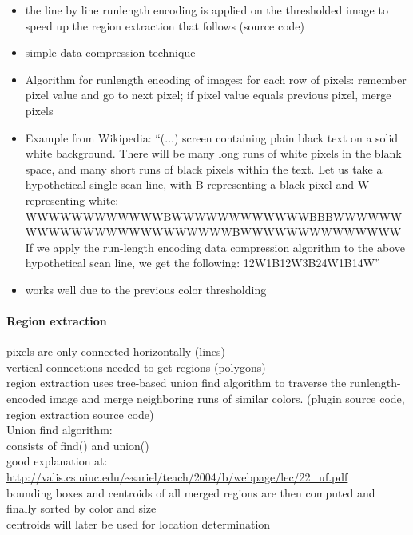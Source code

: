 \begin{itemize}
  \item the line by line runlength encoding is applied on the thresholded image to speed up the region extraction that follows (source code)
  \item simple data compression technique
  \item Algorithm for runlength encoding of images:
for each row of pixels:
remember pixel value and go to next pixel;
if pixel value equals previous pixel, merge pixels
  \item Example from Wikipedia:
“(...) screen containing plain black text on a solid white background. There will be many long runs of white pixels in the blank space, and many short runs of black pixels within the text. Let us take a hypothetical single scan line, with B representing a black pixel and W representing white:
WWWWWWWWWWWWBWWWWWWWWWWWWBBBWWWWWWWWWWWWWWWWWWWWWWWWBWWWWWWWWWWWWWW
If we apply the run-length encoding data compression algorithm to the above hypothetical scan line, we get the following:
12W1B12W3B24W1B14W”
  \item works well due to the previous color thresholding
\end{itemize}

\paragraph{Region extraction}

pixels are only connected horizontally (lines)\\
vertical connections needed to get regions (polygons)\\
region extraction uses tree-based union find algorithm to traverse the
runlength-encoded image and merge neighboring runs of similar colors. (plugin
source code, region extraction source code)\\

Union find algorithm:\\
consists of find() and union()\\
good explanation at:
\url{http://valis.cs.uiuc.edu/~sariel/teach/2004/b/webpage/lec/22_uf.pdf} \\

bounding boxes and centroids of all merged regions are then computed and finally
sorted by color and size\\

centroids will later be used for location determination





